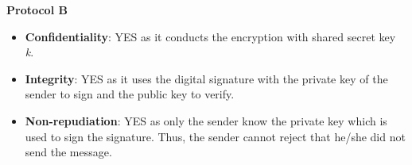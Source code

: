 \textbf{Protocol B}

\begin{itemize}
    \item \textbf{Confidentiality}: YES as it conducts the encryption with shared
    secret key \emph{k}.
    \item \textbf{Integrity}: YES as it uses the digital signature with the private
    key of the sender to sign and the public key to verify.
    \item \textbf{Non-repudiation}: YES as only the sender know the private key which
    is used to sign the signature. Thus, the sender cannot reject that he/she did not
    send the message.
\end{itemize}